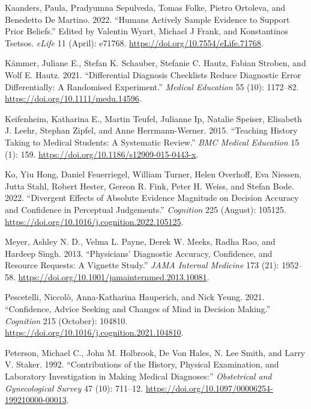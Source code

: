\documentclass[a4paper, nobind]{templates/ociamthesis}
\newlength{\cslhangindent}
\newenvironment{CSLReferences}[2] %
 {%
  \setlength{\parindent}{0pt}
  \ifodd #1
  \let\oldpar\par
  \def\par{\hangindent=\cslhangindent\oldpar}
  \fi
  \setlength{\parskip}{1mm}
  \setlength{\baselineskip}{6mm}
 }%
 {}
\begin{document}
\begin{CSLReferences}{1}{0}
Kaanders, Paula, Pradyumna Sepulveda, Tomas Folke, Pietro Ortoleva, and Benedetto De Martino. 2022. {``Humans Actively Sample Evidence to Support Prior Beliefs.''} Edited by Valentin Wyart, Michael J Frank, and Konstantinos Tsetsos. \emph{eLife} 11 (April): e71768. \url{https://doi.org/10.7554/eLife.71768}.

Kämmer, Juliane E., Stefan K. Schauber, Stefanie C. Hautz, Fabian Stroben, and Wolf E. Hautz. 2021. {``Differential Diagnosis Checklists Reduce Diagnostic Error Differentially: {A} Randomised Experiment.''} \emph{Medical Education} 55 (10): 1172--82. \url{https://doi.org/10.1111/medu.14596}.

Keifenheim, Katharina E., Martin Teufel, Julianne Ip, Natalie Speiser, Elisabeth J. Leehr, Stephan Zipfel, and Anne Herrmann-Werner. 2015. {``Teaching History Taking to Medical Students: A Systematic Review.''} \emph{BMC Medical Education} 15 (1): 159. \url{https://doi.org/10.1186/s12909-015-0443-x}.

Ko, Yiu Hong, Daniel Feuerriegel, William Turner, Helen Overhoff, Eva Niessen, Jutta Stahl, Robert Hester, Gereon R. Fink, Peter H. Weiss, and Stefan Bode. 2022. {``Divergent Effects of Absolute Evidence Magnitude on Decision Accuracy and Confidence in Perceptual Judgements.''} \emph{Cognition} 225 (August): 105125. \url{https://doi.org/10.1016/j.cognition.2022.105125}.

Meyer, Ashley N. D., Velma L. Payne, Derek W. Meeks, Radha Rao, and Hardeep Singh. 2013. {``Physicians' {Diagnostic} {Accuracy}, {Confidence}, and {Resource} {Requests}: {A} {Vignette} {Study}.''} \emph{JAMA Internal Medicine} 173 (21): 1952--58. \url{https://doi.org/10.1001/jamainternmed.2013.10081}.

Pescetelli, Niccolò, Anna-Katharina Hauperich, and Nick Yeung. 2021. {``Confidence, Advice Seeking and Changes of Mind in Decision Making.''} \emph{Cognition} 215 (October): 104810. \url{https://doi.org/10.1016/j.cognition.2021.104810}.

Peterson, Michael C., John M. Holbrook, De Von Hales, N. Lee Smith, and Larry V. Staker. 1992. {``Contributions of the {History}, {Physical} {Examination}, and {Laboratory} {Investigation} in {Making} {Medical} {Diagnoses}:''} \emph{Obstetrical and Gynecological Survey} 47 (10): 711--12. \url{https://doi.org/10.1097/00006254-199210000-00013}.


\end{CSLReferences}
\end{document}
